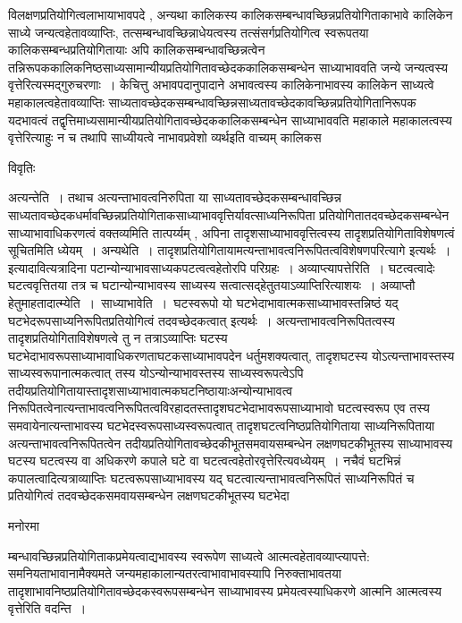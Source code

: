 \documentclass[10pt, openany]{book}
\begin{document}
{विलक्षणप्रतियोगित्वलाभायाभावपदे , अन्यथा कालिकस्य कालिकसम्बन्धावच्छिन्नप्रतियोगिताकाभावे कालिकेन साध्ये जन्यत्वहेतावव्याप्तिः, तत्सम्बन्धावच्छिन्नाधेयत्वस्य तत्संसर्गप्रतियोगित्व स्वरूपतया कालिकसम्बन्धप्रतियोगितायाः अपि कालिकसम्बन्धावच्छिन्नत्वेन तन्निरूपककालिकनिष्ठसाध्यसामान्यीयप्रतियोगितावच्छेदककालिकसम्बन्धेन साध्याभाववति जन्ये जन्यत्वस्य वृत्तेरित्यस्मद्गुरुचरणाः~। केचित्तु अभावपदानुपादाने अभावत्वस्य कालिकेनाभावस्य कालिकेन साध्यत्वे महाकालत्वहेतावव्याप्तिः
साध्यतावच्छेदकसम्बन्धावच्छिन्नसाध्यतावच्छेदकावच्छिन्नप्रतियोगितानिरूपक यदभावत्वं तद्वृत्तिमाध्यसामान्यीयप्रतियोगितावच्छेदककालिकसम्बन्धेन साध्याभाववति महाकाले महाकालत्वस्य वृत्तेरित्याहुः न च तथापि साध्यीयत्वे नाभावप्रवेशो व्यर्थइति वाच्यम् कालिकस
\newpage
 \begin{center}     विवृतिः \end{center} 
अत्यन्तेति~। तथाच अत्यन्ताभावत्वनिरुपिता या साध्यतावच्छेदकसम्बन्धावच्छिन्न साध्यतावच्छेदकधर्मावच्छिन्नप्रतियोगिताकसाध्याभाववृत्तिर्यावत्साध्यनिरूपिता प्रतियोगितातदवच्छेदकसम्बन्धेन साध्याभावाधिकरणत्वं वक्तव्यमिति तात्पर्य्यम् , अपिना तादृशसाध्याभाववृत्तित्वस्य तादृशप्रतियोगिताविशेषणत्वं सूचितमिति ध्येयम्~। अन्यथेति~। तादृशप्रतियोगितायामत्यन्ताभावत्वनिरूपितत्वविशेषणपरित्यागे इत्यर्थः~। इत्यादावित्यत्रादिना पटान्योन्याभावसाध्यकपटत्वत्वहेतोरपि परिग्रहः~। {\qt अव्याप्त्यापत्तेरिति~}। घटत्वत्वादेः घटत्ववृत्तितया तत्र च घटान्योन्याभावस्य साध्यस्य सत्वात्सद्हेतुतयाऽव्याप्तिरित्याशयः~। अव्याप्तौ हेतुमाह\textendash  तादात्म्येति~।~{\qt साध्याभावेति~।}~घटस्वरूपो यो घटभेदाभावात्मकसाध्याभावस्तन्निष्ठं यद् घटभेदरूपसाध्यनिरूपितप्रतियोगित्वं तदवच्छेदकत्वात् इत्यर्थः~। अत्यन्ताभावत्वनिरूपितत्वस्य तादृशप्रतियोगिताविशेषणत्वे तु न तत्राऽव्याप्तिः घटस्य घटभेदाभावरूपसाध्याभावाधिकरणताघटकसाध्याभावपदेन धर्तुमशक्यत्वात्, तादृशघटस्य योऽत्यन्ताभावस्तस्य
साध्यस्वरूपानात्मकत्वात् तस्य योऽन्योन्याभावस्तस्य साध्यस्वरूपत्वेऽपि तदीयप्रतियोगितायास्तादृशसाध्याभावात्मकघटनिष्ठायाःअन्योन्याभावत्व निरूपितत्वेनात्यन्ताभावत्वनिरूपितत्वविरहादतस्तादृशघटभेदाभावरूपसाध्याभावो घटत्वस्वरूप एव तस्य समवायेनात्यन्ताभावस्य घटभेदस्वरूपसाध्यस्वरूपत्वात् तादृशघटत्वनिष्ठप्रतियोगिताया साध्यनिरूपिताया अत्यन्ताभावत्वनिरूपितत्वेन तदीयप्रतियोगितावच्छेदकीभूतसमवायसम्बन्धेन लक्षणघटकीभूतस्य साध्याभावस्य घटस्य घटत्वस्य वा अधिकरणे कपाले घटे वा घटत्वत्वहेतोरवृत्तेरित्यवध्येयम्~। नचैवं घटभिन्नं कपालत्वादित्यत्राव्याप्तिः घटत्वरूपसाध्याभावस्य यद् घटत्वात्यन्ताभावत्वनिरूपितं साध्यनिरूपितं च प्रतियोगित्वं तदवच्छेदकसमवायसम्बन्धेन लक्षणघटकीभूतस्य घटभेदा
 \begin{center}   मनोरमा  \end{center} 
म्बन्धावच्छिन्नप्रतियोगिताकप्रमेयत्वाद्यभावस्य स्वरूपेण साध्यत्वे आत्मत्वहेतावव्याप्त्यापत्ते: समनियताभावानामैक्यमते जन्यमहाकालान्यतरत्वाभावाभावस्यापि निरुक्ताभावतया तादृशाभावनिष्ठप्रतियोगितावच्छेदकस्वरूपसम्बन्धेन साध्याभावस्य प्रमेयत्वस्याधिकरणे आत्मनि आत्मत्वस्य वृत्तेरिति वदन्ति~।~\\

}
\end{document}
